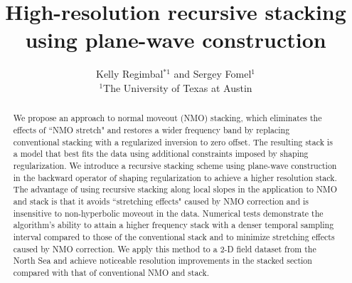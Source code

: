 
\title{High-resolution recursive stacking using plane-wave construction}

\author{Kelly Regimbal$^{*1}$ and Sergey Fomel$^{1}$
\\
$^1$The University of Texas at Austin}

\maketitle


\begin{abstract}
We propose an approach to normal moveout (NMO) stacking, which eliminates the effects of ``NMO stretch" and 
restores a wider frequency band by replacing conventional stacking with a regularized inversion to zero offset. 
The resulting stack is a model that best fits the data using additional constraints imposed by 
shaping regularization. We introduce a recursive stacking scheme
using plane-wave construction in the backward operator of shaping regularization to achieve a higher resolution stack. 
The advantage of using recursive stacking along local slopes in the application to NMO 
and stack is that it avoids ``stretching effects" caused by NMO correction and is insensitive to 
non-hyperbolic moveout in the data. Numerical tests 
demonstrate the algorithm's ability to attain a higher frequency 
stack with a denser temporal sampling interval compared to those of the conventional stack and to
minimize stretching effects caused by NMO correction. We apply this method to a 2-D 
field dataset from the North Sea and achieve 
noticeable resolution improvements in the stacked section compared with that of conventional NMO and stack. 
\end{abstract}

